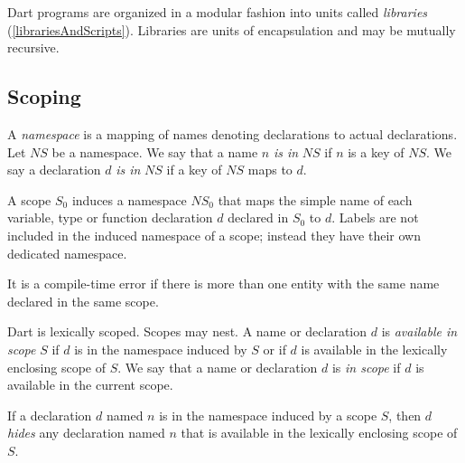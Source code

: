 \documentclass{article}
\begin{document}
\LMHash{}
Dart programs are organized in a modular fashion into units called {\em libraries} (\ref{librariesAndScripts}). Libraries are units of encapsulation and may be mutually recursive.


\subsection{Scoping}

\LMHash{}
A {\em namespace} is a mapping of names denoting declarations to actual declarations.  Let $NS$ be a namespace. We say that a name $n$ {\em is in }$NS$ if $n$ is a key of $NS$. We say a declaration $d$ {\em is in }$NS$ if a key of $NS$ maps to $d$.

\LMHash{}
A scope $S_0$ induces a namespace $NS_0$ that maps the simple name of each variable, type or function declaration $d$ declared in $S_0$ to $d$. Labels are not included in the induced namespace of a scope; instead they have their own dedicated namespace.


\LMHash{}
It is a compile-time error if there is more than one entity with the same name declared in the same scope.


\LMHash{}
Dart is lexically scoped.    Scopes may nest.  A name or declaration $d$ is {\em available in scope} $S$ if $d$ is in the namespace induced by $S$ or if $d$ is available in the lexically enclosing scope of $S$. We  say that a name or declaration $d$ is {\em in scope} if $d$ is available in the current scope.


\LMHash{}
If a  declaration $d$ named $n$ is in the namespace induced by a scope $S$, then $d$ {\em hides} any declaration named $n$ that is available in the lexically enclosing scope of $S$.
\end{document}
